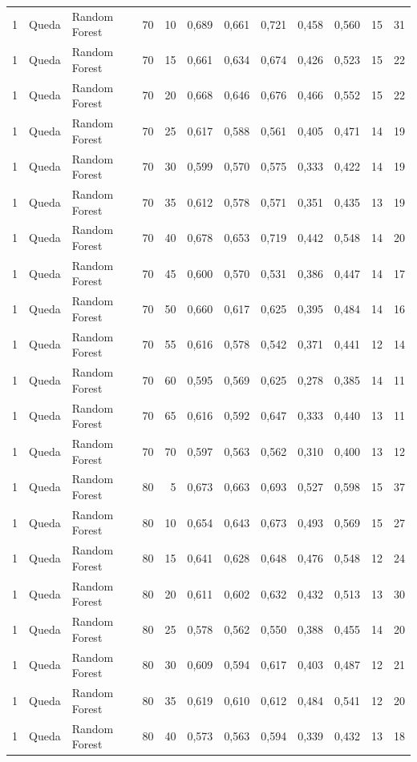 \begin{longtable}{@{}rllrrrrrrrrr@{}}
1 & Queda & Random Forest & 70 & 10 & 0,689 & 0,661 & 0,721 & 0,458 & 0,560 & 15 & 31 \\
1 & Queda & Random Forest & 70 & 15 & 0,661 & 0,634 & 0,674 & 0,426 & 0,523 & 15 & 22 \\
1 & Queda & Random Forest & 70 & 20 & 0,668 & 0,646 & 0,676 & 0,466 & 0,552 & 15 & 22 \\
1 & Queda & Random Forest & 70 & 25 & 0,617 & 0,588 & 0,561 & 0,405 & 0,471 & 14 & 19 \\
1 & Queda & Random Forest & 70 & 30 & 0,599 & 0,570 & 0,575 & 0,333 & 0,422 & 14 & 19 \\
1 & Queda & Random Forest & 70 & 35 & 0,612 & 0,578 & 0,571 & 0,351 & 0,435 & 13 & 19 \\
1 & Queda & Random Forest & 70 & 40 & 0,678 & 0,653 & 0,719 & 0,442 & 0,548 & 14 & 20 \\
1 & Queda & Random Forest & 70 & 45 & 0,600 & 0,570 & 0,531 & 0,386 & 0,447 & 14 & 17 \\
1 & Queda & Random Forest & 70 & 50 & 0,660 & 0,617 & 0,625 & 0,395 & 0,484 & 14 & 16 \\
1 & Queda & Random Forest & 70 & 55 & 0,616 & 0,578 & 0,542 & 0,371 & 0,441 & 12 & 14 \\
1 & Queda & Random Forest & 70 & 60 & 0,595 & 0,569 & 0,625 & 0,278 & 0,385 & 14 & 11 \\
1 & Queda & Random Forest & 70 & 65 & 0,616 & 0,592 & 0,647 & 0,333 & 0,440 & 13 & 11 \\
1 & Queda & Random Forest & 70 & 70 & 0,597 & 0,563 & 0,562 & 0,310 & 0,400 & 13 & 12 \\
1 & Queda & Random Forest & 80 & 5 & 0,673 & 0,663 & 0,693 & 0,527 & 0,598 & 15 & 37 \\
1 & Queda & Random Forest & 80 & 10 & 0,654 & 0,643 & 0,673 & 0,493 & 0,569 & 15 & 27 \\
1 & Queda & Random Forest & 80 & 15 & 0,641 & 0,628 & 0,648 & 0,476 & 0,548 & 12 & 24 \\
1 & Queda & Random Forest & 80 & 20 & 0,611 & 0,602 & 0,632 & 0,432 & 0,513 & 13 & 30 \\
1 & Queda & Random Forest & 80 & 25 & 0,578 & 0,562 & 0,550 & 0,388 & 0,455 & 14 & 20 \\
1 & Queda & Random Forest & 80 & 30 & 0,609 & 0,594 & 0,617 & 0,403 & 0,487 & 12 & 21 \\
1 & Queda & Random Forest & 80 & 35 & 0,619 & 0,610 & 0,612 & 0,484 & 0,541 & 12 & 20 \\
1 & Queda & Random Forest & 80 & 40 & 0,573 & 0,563 & 0,594 & 0,339 & 0,432 & 13 & 18 \\

\end{longtable}
